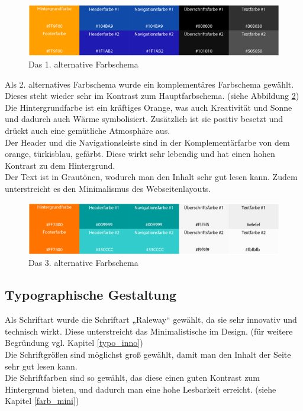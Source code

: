 \begin{figure} [hp]
\includegraphics[width=\textwidth]{./img/mini_farb2.png}
\caption{Das 1. alternative Farbschema }
\label{mini_farb2}
\end{figure}

Als 2. alternatives Farbschema wurde ein komplementäres Farbschema gewählt. Dieses steht wieder sehr im Kontrast zum Hauptfarbschema. (siehe Abbildung \ref{mini_farb3})
\\
Die Hintergrundfarbe ist ein kräftiges Orange, was auch Kreativität und Sonne und dadurch auch Wärme symbolisiert. Zusätzlich ist sie positiv besetzt und drückt auch eine gemütliche Atmosphäre aus.
\\
Der Header und die Navigationsleiste sind in der Komplementärfarbe von dem orange, türkisblau,  gefärbt. Diese wirkt sehr lebendig und hat einen hohen Kontrast zu dem Hintergrund.
\\
Der Text ist in Grautönen, wodurch man den Inhalt sehr gut lesen kann. Zudem unterstreicht es den Minimalismus des Webseitenlayouts.

\begin{figure} [hp]
\includegraphics[width=\textwidth]{./img/mini_farb3.png}
\caption{Das 3. alternative Farbschema }
\label{mini_farb3}
\end{figure}

	\subsection{Typographische Gestaltung}\label{chapter:mini:typo}

Als Schriftart wurde die Schriftart „Raleway“ gewählt, da sie sehr innovativ und technisch wirkt. Diese unterstreicht das Minimalistische im Design. (für weitere Begründung vgl. Kapitel \ref{typo_inno})
\\
Die Schriftgrößen sind möglichst groß gewählt, damit man den Inhalt der Seite sehr gut lesen kann.
\\
Die Schriftfarben sind so gewählt, das diese einen guten Kontrast zum Hintergrund bieten, und dadurch man eine hohe Lesbarkeit erreicht. (siehe Kapitel \ref{farb_mini})


